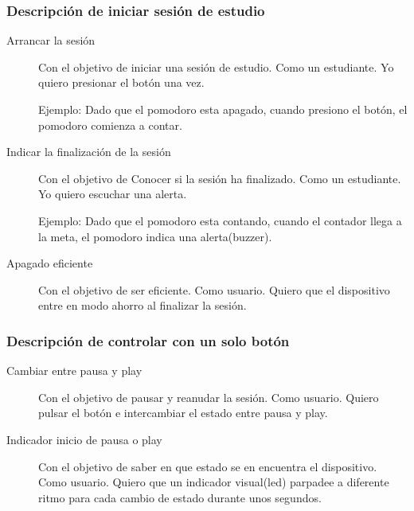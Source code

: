 \documentclass{article}
\begin{document}
\subsubsection{Descripción de iniciar sesión de estudio}
\begin{description}
	\item [Arrancar la sesión] Con el objetivo de iniciar una sesión de 
		estudio. Como un estudiante. Yo quiero presionar el botón una
		vez.

		Ejemplo: Dado que el pomodoro esta apagado, cuando presiono el
		botón, el pomodoro comienza a contar.
	
	\item [Indicar la finalización de la sesión] Con el objetivo de Conocer
		si la sesión ha finalizado. Como un estudiante. Yo quiero 
		escuchar una alerta.

		Ejemplo: Dado que el pomodoro esta contando, cuando el contador
		llega a la meta, el pomodoro indica una alerta(buzzer).

	\item [Apagado eficiente] Con el objetivo de ser eficiente. 
		Como usuario. Quiero que el dispositivo entre en modo ahorro
		al finalizar la sesión.
\end{description}
\subsubsection{Descripción de controlar con un solo botón}
\begin{description}
	\item[Cambiar entre pausa y play] Con el objetivo de pausar y reanudar
		la sesión. Como usuario. Quiero pulsar el botón e intercambiar
		el estado entre pausa y play.

	\item[Indicador inicio de pausa o play] Con el objetivo de saber en que
		estado se en encuentra el dispositivo. Como usuario. Quiero que
		un indicador visual(led) parpadee a diferente ritmo para cada 
		cambio de estado durante unos segundos.
\end{description}
\end{document}
